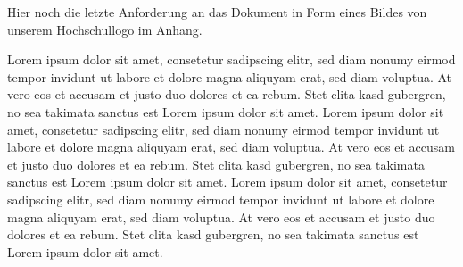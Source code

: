 

\setcounter{figure}{0}


Hier noch die letzte Anforderung an das Dokument in Form eines Bildes von unserem Hochschullogo im Anhang.

Lorem ipsum dolor sit amet, consetetur sadipscing elitr, sed diam nonumy eirmod tempor invidunt ut 
labore et dolore magna aliquyam erat, sed diam voluptua. At vero eos et accusam et justo duo dolores et 
ea rebum. Stet clita kasd gubergren, no sea takimata sanctus est Lorem ipsum dolor sit amet. Lorem ipsum 
dolor sit amet, consetetur sadipscing elitr, sed diam nonumy eirmod tempor invidunt ut labore et dolore 
magna aliquyam erat, sed diam voluptua. At vero eos et accusam et justo duo dolores et ea rebum. Stet 
clita kasd gubergren, no sea takimata sanctus est Lorem ipsum dolor sit amet. Lorem ipsum dolor sit
amet, consetetur sadipscing elitr, sed diam nonumy eirmod tempor invidunt ut labore et dolore magna
aliquyam erat, sed diam voluptua. At vero eos et accusam et justo duo dolores et ea rebum. Stet 
clita kasd gubergren, no sea takimata sanctus est Lorem ipsum dolor sit amet.   

